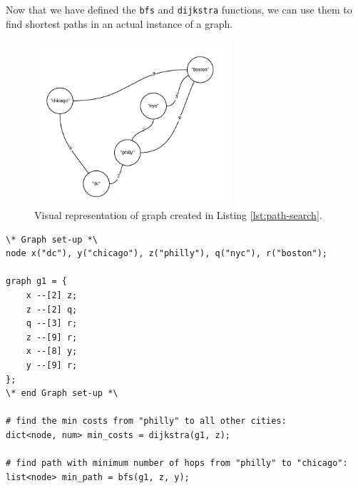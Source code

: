 \documentclass{article}
\newcommand{\code}[1]{\texttt{#1}} %
\begin{document}




Now that we have defined the \code{bfs} and \code{dijkstra} functions, we can use them to find shortest paths in an actual instance of a graph.

\begin{figure}[H]
\centering
\includegraphics[width=0.65\textwidth]{graphs/example_city_graph.png}
\caption{Visual representation of graph created in Listing \ref{lst:path-search}.}
\label{fig:node_ops}
\end{figure}


\begin{lstlisting}[language=pltLang, caption=Using user-defined functions., label=lst:path-search]
\* Graph set-up *\
node x("dc"), y("chicago"), z("philly"), q("nyc"), r("boston");

graph g1 = {
    x --[2] z;
    z --[2] q;
    q --[3] r;
    z --[9] r;
    x --[8] y;
    y --[9] r;
};
\* end Graph set-up *\

# find the min costs from "philly" to all other cities:
dict<node, num> min_costs = dijkstra(g1, z);

# find path with minimum number of hops from "philly" to "chicago":
list<node> min_path = bfs(g1, z, y);


\end{lstlisting}
\end{document}
